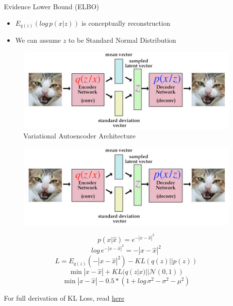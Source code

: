 \begin{frame}[allowframebreaks]{Evidence Lower Bound (ELBO)}
\framebreak
\begin{itemize}
    \item $E_{q(z)}(log \, p(x|z))$ is conceptually reconstruction
    \item We can assume $z$ to be Standard Normal Distribution
\end{itemize}
\vspace{1em}
\begin{figure}
    \centering
    \includegraphics[height=0.5\textheight, width=\textwidth, keepaspectratio]{images/vae/architecture.png}
    \caption*{Variational Autoencoder Architecture}
\end{figure}

\framebreak
\begin{figure}
    \centering
    \includegraphics[height=0.3\textheight, width=\textwidth, keepaspectratio]{images/vae/architecture.png}
\end{figure}
$$p(x|\hat{x}) = e^{-|x-\hat{x}|^2}$$
$$log \, e^{-|x-\hat{x}|^2} = -|x-\hat{x}|^2$$
$$L = E_{q(z)}(-|x-\hat{x}|^2) - KL(q(z)||p(z))$$
$$\min |x-\hat{x}| + KL(q(z|x)||\mathcal{N}(0,1))$$
$$\min |x-\hat{x}| - 0.5 * (1 + log \, \sigma^2 - \sigma^2 - \mu^2)$$

For full derivation of KL Loss, read \href{https://deepai.org/publication/tutorial-deriving-the-standard-variational-autoencoder-vae-loss-function}{here}
\end{frame}